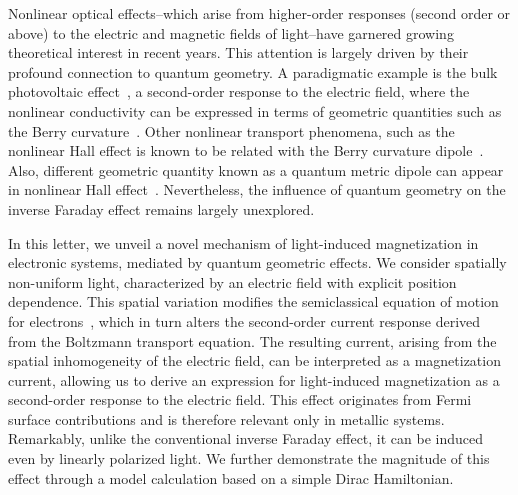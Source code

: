 \documentclass[aps,prb,longbibliography,superscriptaddress,twocolumn]{revtex4-2}
\begin{document}
Nonlinear optical effects--which arise from higher-order responses (second order or above) to the electric and magnetic fields of light--have garnered growing theoretical interest in recent years. This attention is largely driven by their profound connection to quantum geometry. A paradigmatic example is the bulk photovoltaic effect~\cite{kraut.vonbaltz1979a,belinicher.sturman1980,vonbaltz.kraut1981a,aversa.sipe1995a,sipe.shkrebtii2000,fridkin2001}, a second-order response to the electric field, where the nonlinear conductivity can be expressed in terms of geometric quantities such as the Berry curvature~\cite{morimoto.nagaosa2016,morimoto.nagaosa2016b,ma.etal2021,ahn.etal2022}. Other nonlinear transport phenomena, such as the nonlinear Hall effect is known to be related with the Berry curvature dipole~\cite{Fu_2015}. Also, different geometric quantity known as a quantum metric dipole can appear in nonlinear Hall effect~\cite{Gao_positional_2014,Liu_2021,Kamal_2023,Gao_Science_2023}. Nevertheless, the influence of quantum geometry on the inverse Faraday effect remains largely unexplored.

In this letter, we unveil a novel mechanism of light-induced magnetization in electronic systems, mediated by quantum geometric effects. We consider spatially non-uniform light, characterized by an electric field with explicit position dependence. This spatial variation modifies the semiclassical equation of motion for electrons~\cite{Lapa_Hughes_2019}, which in turn alters the second-order current response derived from the Boltzmann transport equation. The resulting current, arising from the spatial inhomogeneity of the electric field, can be interpreted as a magnetization current, allowing us to derive an expression for light-induced magnetization as a second-order response to the electric field. This effect originates from Fermi surface contributions and is therefore relevant only in metallic systems. Remarkably, unlike the conventional inverse Faraday effect, it can be induced even by linearly polarized light. We further demonstrate the magnitude of this effect through a model calculation based on a simple Dirac Hamiltonian.
\end{document}
